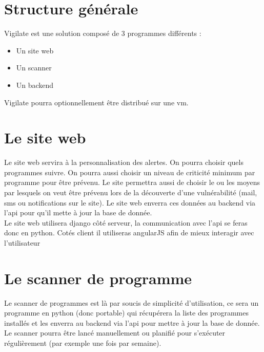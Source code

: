 \section{Structure générale}
Vigilate est une solution composé de 3 programmes différents :\\
\begin{itemize}
\item Un site web\\
\item Un scanner\\
\item Un backend\\
\end{itemize}
Vigilate pourra optionnellement être distribué sur une vm.\\
\section{Le site web}
Le site web servira à la personnalisation des alertes. On pourra choisir quels programmes suivre. On pourra aussi choisir un niveau de criticité minimum par programme  pour être prévenu. Le site permettra aussi de choisir le ou les moyens par lesquels on veut être prévenu lors de la découverte d’une vulnérabilité (mail, sms ou notifications sur le site). Le site web enverra ces données au backend via l’api pour qu’il mette à jour la base de donnée.\\
Le site web utilisera django côté serveur, la communication avec l’api se feras donc en python. Cotés client il utiliseras angularJS afin de mieux interagir avec l'utilisateur\\

\section{Le scanner de programme}
Le scanner de programmes est là par soucis de simplicité d’utilisation, ce sera un programme en python (donc portable) qui récupérera la liste des programmes installés et les enverra au backend via l’api pour mettre à jour la base de donnée. Le scanner pourra être lancé manuellement ou planifié pour s’exécuter régulièrement (par exemple une fois par semaine).\\

